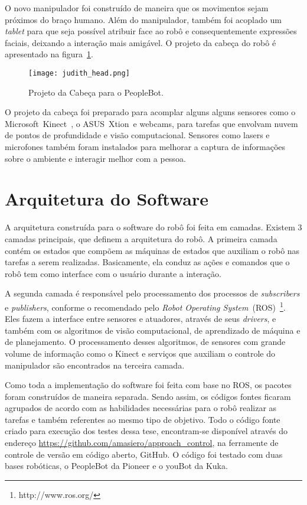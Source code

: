 O novo manipulador foi construído de maneira que os movimentos sejam próximos do braço humano. Além do manipulador, também foi acoplado um \emph{tablet} para que seja possível atribuir face ao robô e consequentemente expressões faciais, deixando a interação mais amigável. O projeto da cabeça do robô é apresentado na figura~\ref{fig:judithhead}.

\begin{figure}[ht!]
	\centering
	\begin{minipage}{0.4\textwidth}
		\caption{Projeto da Cabeça para o PeopleBot.}
		\texttt{[image: judith\_head.png]}
		\label{fig:judithhead}
	\end{minipage}
\end{figure}

O projeto da cabeça foi preparado para acomplar alguns alguns sensores como o Microsoft\textregistered\ Kinect\textregistered\ , o ASUS\textregistered\ Xtion\textregistered\ e webcams, para tarefas que envolvam nuvem de pontos de profundidade e visão computacional. Sensores como lasers e microfones também foram instalados para melhorar a captura de informações sobre o ambiente e interagir melhor com a pessoa.

\section{Arquitetura do Software}
\label{sec:arquitetura}
A arquitetura construída para o software do robô foi feita em camadas. Existem 3 camadas principais, que definem a arquitetura do robô. A primeira camada contém os estados que compõem as máquinas de estados que auxiliam o robô nas tarefas a serem realizadas. Basicamente, ela conduz as ações e comandos que o robô tem como interface com o usuário durante a interação.

A segunda camada é responsável pelo processamento dos processos de \emph{subscribers} e \emph{publishers}, conforme o recomendado pelo \emph{Robot Operating System}~(ROS)~\footnote{http://www.ros.org/}. Eles fazem a interface entre sensores e atuadores, através de seus \emph{drivers}, e também com os algoritmos de visão computacional, de aprendizado de máquina e de planejamento. O processamento desses algoritmos, de sensores com grande volume de informação como o Kinect e serviços que auxiliam o controle do manipulador são encontrados na terceira camada.

Como toda a implementação do software foi feita com base no ROS, os pacotes foram construídos de maneira separada. Sendo assim, os códigos fontes ficaram agrupados de acordo com as habilidades necessárias para o robô realizar as tarefas e também referentes ao mesmo tipo de objetivo. Todo o código fonte criado para execução dos testes dessa tese, encontram-se disponível através do endereço \url{https://github.com/amasiero/approach_control}, na ferramente de controle de versão em código aberto, GitHub. O código foi testado com duas bases robóticas, o PeopleBot da Pioneer e o youBot da Kuka.

